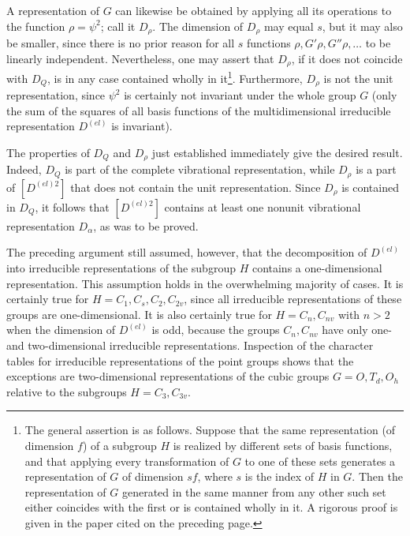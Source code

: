 A representation of $G$ can likewise be obtained by applying all its operations to the function $\rho=\psi^2$; call it $D_\rho$. The dimension of $D_\rho$ may equal $s$, but it may also be smaller, since there is no prior reason for all $s$ functions $\rho,G'\rho,G''\rho,\ldots$ to be linearly independent. Nevertheless, one may assert that $D_\rho$, if it does not coincide with $D_Q$, is in any case contained wholly in it\footnote{The general assertion is as follows. Suppose that the same representation (of dimension $f$) of a subgroup $H$ is realized by different sets of basis functions, and that applying every transformation of $G$ to one of these sets generates a representation of $G$ of dimension $sf$, where $s$ is the index of $H$ in $G$. Then the representation of $G$ generated in the same manner from any other such set either coincides with the first or is contained wholly in it. A rigorous proof is given in the paper cited on the preceding page.}. Furthermore, $D_\rho$ is not the unit representation, since $\psi^2$ is certainly not invariant under the whole group $G$ (only the sum of the squares of all basis functions of the multidimensional irreducible representation $D^{(el)}$ is invariant).

The properties of $D_Q$ and $D_\rho$ just established immediately give the desired result. Indeed, $D_Q$ is part of the complete vibrational representation, while $D_\rho$ is a part of $[D^{(el)2}]$ that does not contain the unit representation. Since $D_\rho$ is contained in $D_Q$, it follows that $[D^{(el)2}]$ contains at least one nonunit vibrational representation $D_\alpha$, as was to be proved.

The preceding argument still assumed, however, that the decomposition of $D^{(el)}$ into irreducible representations of the subgroup $H$ contains a one-dimensional representation. This assumption holds in the overwhelming majority of cases. It is certainly true for $H=C_1,C_s,C_2,C_{2v}$, since all irreducible representations of these groups are one-dimensional. It is also certainly true for $H=C_n,C_{nv}$ with $n>2$ when the dimension of $D^{(el)}$ is odd, because the groups $C_n,C_{nv}$ have only one- and two-dimensional irreducible representations. Inspection of the character tables for irreducible representations of the point groups shows that the exceptions are two-dimensional representations of the cubic groups $G=O,T_d,O_h$ relative to the subgroups $H=C_3,C_{3v}$.

